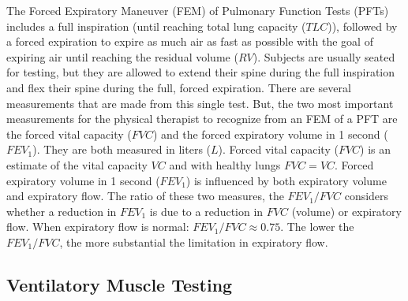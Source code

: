 The Forced Expiratory Maneuver (FEM) of Pulmonary Function Tests (PFTs) includes a full inspiration (until reaching total lung capacity ($TLC$)), followed by a forced expiration to expire as much air as fast as possible with the goal of expiring air until reaching the residual volume ($RV$). Subjects are usually seated for testing, but they are allowed to extend their spine during the full inspiration and flex their spine during the full, forced expiration. There are several measurements that are made from this single test. But, the two most important measurements for the physical therapist to recognize from an FEM of a PFT are the forced vital capacity ($FVC$) and the forced expiratory volume in 1 second ($FEV_1$). They are both measured in liters ($L$). 
Forced vital capacity ($FVC$) is an estimate of the vital capacity $VC$ and with healthy lungs $FVC = VC$. Forced expiratory volume in 1 second ($FEV_1$) is influenced by both expiratory volume and expiratory flow. The ratio of these two measures, the $FEV_1/FVC$ considers whether a reduction in $FEV_1$ is due to a reduction in $FVC$ (volume) or expiratory flow. When expiratory flow is normal: $FEV_1/FVC \approx 0.75$. The lower the $FEV_1/FVC$, the more substantial the limitation in expiratory flow.

\subsection{Ventilatory Muscle Testing}

